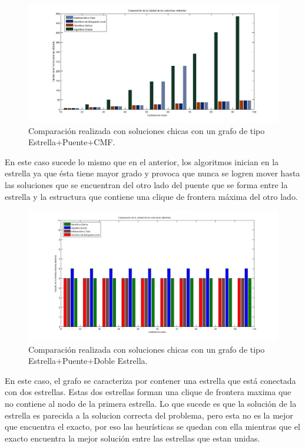  \begin{figure}[H] %
\begin{center}
\includegraphics[width=400pt]{../imgs/calidadSolucionesChica14.jpg}
\caption{Comparación realizada con soluciones chicas con un grafo de tipo Estrella+Puente+CMF.}
\end{center}
\end{figure}

En este caso sucede lo mismo que en el anterior, los algoritmos inician en la estrella ya que ésta tiene mayor grado y provoca que nunca se logren mover hasta las soluciones que se encuentran del otro lado del puente que se forma entre la estrella y la estructura que contiene una clique de frontera máxima del otro lado.

 \begin{figure}[H] %
\begin{center}
\includegraphics[width=400pt]{../imgs/calidadSolucionesChicas17.jpg}
\caption{Comparación realizada con soluciones chicas con un grafo de tipo Estrella+Puente+Doble Estrella.}
\end{center}
\end{figure}


En este caso, el grafo se caracteriza por contener una estrella que está conectada con dos estrellas. Estas dos estrellas forman una clique de frontera maxima que no contiene al nodo de la primera estrella. Lo que sucede es que la solución de la estrella es parecida a la solucion correcta del problema, pero esta no es la mejor que encuentra el exacto, por eso las heurísticas se quedan con ella mientras que el exacto encuentra la mejor solución entre las estrellas que estan unidas.


